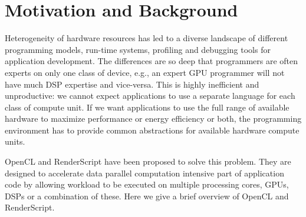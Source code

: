 \section{Motivation and Background}


Heterogeneity of hardware resources has led to a diverse landscape
of different programming models, run-time systems, profiling and debugging tools
for application development. The differences are so deep that programmers are
often experts on only one class of device, e.g., an expert GPU programmer will
not have much DSP expertise and vice-versa. This is highly inefficient and
unproductive: we cannot expect applications to use a separate language for each
class of compute unit. If we want applications to use the full range of
available hardware to maximize performance or energy efficiency or both, the
programming environment has to provide common abstractions for available
hardware compute units.

OpenCL and RenderScript have been proposed to solve this problem. They are
designed to accelerate data parallel computation intensive part of application
code by allowing workload to be executed on multiple processing cores, GPUs,
DSPs or a combination of these. Here we give a brief overview of OpenCL and
RenderScript.



